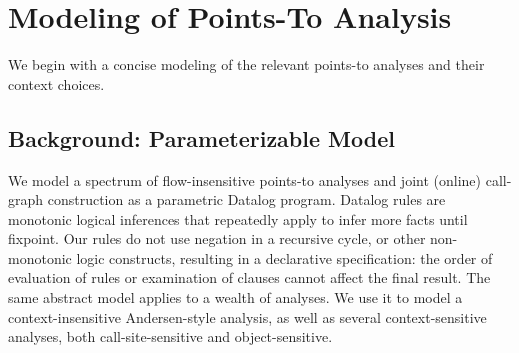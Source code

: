 



\section{Modeling of Points-To Analysis}
\label{sec:model}

We begin with a concise modeling of the relevant points-to analyses
and their context choices.

\subsection{Background: Parameterizable Model}

We model a spectrum of flow-insensitive points-to analyses and joint
(online) call-graph construction as a parametric Datalog program.
Datalog rules are monotonic logical inferences that repeatedly apply
to infer more facts until fixpoint. Our rules do not use negation in a
recursive cycle, or other non-monotonic logic constructs, resulting in
a declarative specification: the order of evaluation of rules or
examination of clauses cannot affect the final result. The same
abstract model applies to a wealth of analyses. We use it to model a
context-insensitive Andersen-style \cite{thesis:Andersen}
analysis, as well as several context-sensitive analyses, both
call-site-sensitive and object-sensitive.

